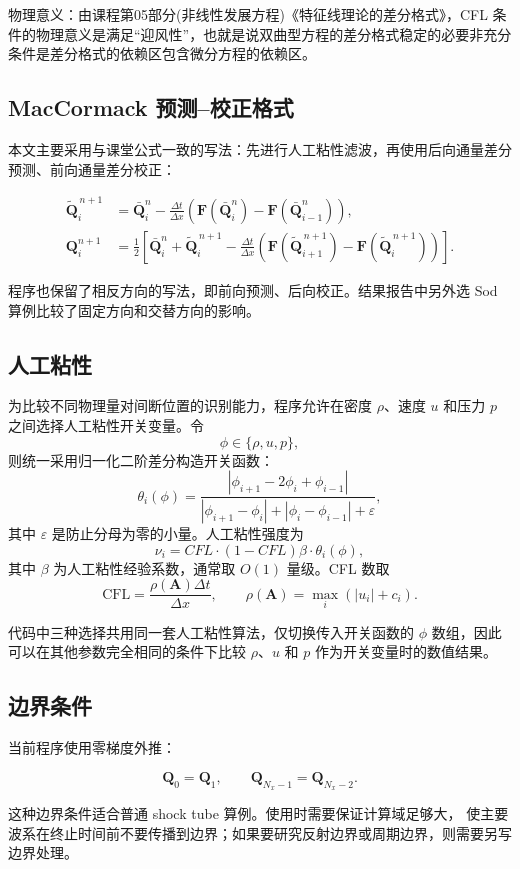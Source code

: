 物理意义：由课程第05部分(非线性发展方程)《特征线理论的差分格式》，CFL 条件的物理意义是满足“迎风性”，也就是说双曲型方程的差分格式稳定的必要非充分条件是差分格式的依赖区包含微分方程的依赖区。

\subsection{MacCormack 预测--校正格式}

本文主要采用与课堂公式一致的写法：先进行人工粘性滤波，再使用后向通量差分预测、前向通量差分校正：

\begin{align}
\widetilde{\bm{Q}}_i^{\,n+1}
&=
\bar{\bm{Q}}_i^n
-
\frac{\Delta t}{\Delta x}
\left(
\bm{F}(\bar{\bm{Q}}_i^n)-\bm{F}(\bar{\bm{Q}}_{i-1}^n)
\right),\\
\bm{Q}_i^{n+1}
&=
\frac{1}{2}
\left[
\bar{\bm{Q}}_i^n+\widetilde{\bm{Q}}_i^{\,n+1}
-
\frac{\Delta t}{\Delta x}
\left(
\bm{F}(\widetilde{\bm{Q}}_{i+1}^{\,n+1})
-
\bm{F}(\widetilde{\bm{Q}}_i^{\,n+1})
\right)
\right].
\end{align}

程序也保留了相反方向的写法，即前向预测、后向校正。结果报告中另外选 Sod 算例比较了固定方向和交替方向的影响。

\subsection{人工粘性}

为比较不同物理量对间断位置的识别能力，程序允许在密度 $\rho$、速度 $u$
和压力 $p$ 之间选择人工粘性开关变量。令
\begin{equation}
\phi\in\{\rho,u,p\},
\end{equation}
则统一采用归一化二阶差分构造开关函数：
\begin{equation}
\theta_i(\phi)=
\frac{
\left|\phi_{i+1}-2\phi_i+\phi_{i-1}\right|
}{
\left|\phi_{i+1}-\phi_{i}\right|
+\left|\phi_{i}-\phi_{i-1}\right|
+\varepsilon
},
\end{equation}
其中 $\varepsilon$ 是防止分母为零的小量。人工粘性强度为
\begin{equation}
\nu_i=CFL\cdot(1-CFL)\beta\cdot\theta_i(\phi),
\end{equation}
其中 $\beta$ 为人工粘性经验系数，通常取 \(O(1)\) 量级。CFL 数取
\[
\mathrm{CFL}=\frac{\rho(\mathbf A)\Delta t}{\Delta x},
\qquad
\rho(\mathbf A)=\max_i(|u_i|+c_i).
\]

代码中三种选择共用同一套人工粘性算法，仅切换传入开关函数的
$\phi$ 数组，因此可以在其他参数完全相同的条件下比较
$\rho$、$u$ 和 $p$ 作为开关变量时的数值结果。

\subsection{边界条件}

当前程序使用零梯度外推：

\begin{equation}
\bm{Q}_0=\bm{Q}_1,
\qquad
\bm{Q}_{N_x-1}=\bm{Q}_{N_x-2}.
\end{equation}

这种边界条件适合普通 shock tube 算例。使用时需要保证计算域足够大，
使主要波系在终止时间前不要传播到边界；如果要研究反射边界或周期边界，则需要另写边界处理。
